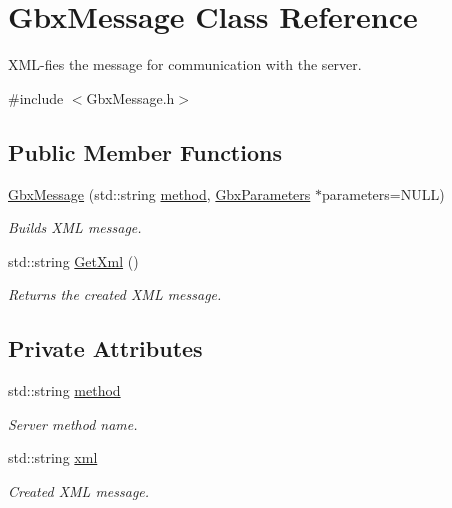 \hypertarget{classGbxMessage}{\section{Gbx\-Message Class Reference}
\label{classGbxMessage}
}


X\-M\-L-\/fies the message for communication with the server.  




{\ttfamily \#include $<$Gbx\-Message.\-h$>$}

\subsection*{Public Member Functions}
\begin{DoxyCompactItemize}
\item 
\hyperlink{classGbxMessage_ad4a5e5f75787e12229cf03aabc4ad930}{Gbx\-Message} (std\-::string \hyperlink{classGbxMessage_a10b6118916999db98f28e3f495eef6b4}{method}, \hyperlink{classGbxParameters}{Gbx\-Parameters} $\ast$parameters=N\-U\-L\-L)
\begin{DoxyCompactList}\small\item\em Builds X\-M\-L message. \end{DoxyCompactList}\item 
std\-::string \hyperlink{classGbxMessage_ac81e16efce7da483a696d6653e18c9d8}{Get\-Xml} ()
\begin{DoxyCompactList}\small\item\em Returns the created X\-M\-L message. \end{DoxyCompactList}\end{DoxyCompactItemize}
\subsection*{Private Attributes}
\begin{DoxyCompactItemize}
\item 
std\-::string \hyperlink{classGbxMessage_a10b6118916999db98f28e3f495eef6b4}{method}
\begin{DoxyCompactList}\small\item\em Server method name. \end{DoxyCompactList}\item 
std\-::string \hyperlink{classGbxMessage_a6ea9adbeb3f1c104fa08fce0b1a4090d}{xml}
\begin{DoxyCompactList}\small\item\em Created X\-M\-L message. \end{DoxyCompactList}\end{DoxyCompactItemize}


